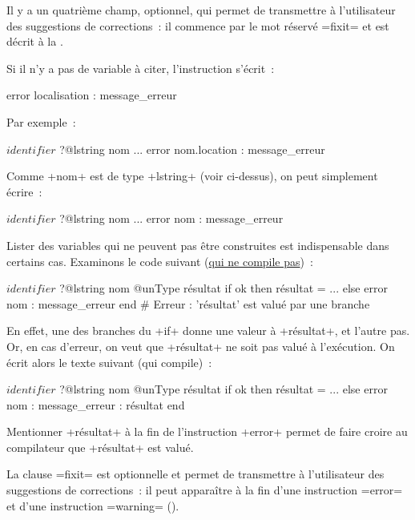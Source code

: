 Il y a un quatrième champ, optionnel, qui permet de transmettre à l'utilisateur des suggestions de corrections~: il commence par le mot réservé \ggsq=fixit= et est décrit à la .

Si il n'y a pas de variable à citer, l'instruction s'écrit~:
\begin{galgas4}
error localisation : message_erreur
\end{galgas4}

Par exemple~:

\begin{galgas4}
$identifier$ ?@lstring nom
...
error nom.location : message_erreur
\end{galgas4}

Comme \ggsq+nom+ est de type \ggsq+lstring+ (voir ci-dessus), on peut simplement écrire~:
\begin{galgas4}
$identifier$ ?@lstring nom
...
error nom : message_erreur
\end{galgas4}



Lister des variables qui ne peuvent pas être construites est indispensable dans certains cas. Examinons le code suivant (\underline{qui ne compile pas})~:
\begin{galgas4}
$identifier$ ?@lstring nom
@unType résultat
if ok then
  résultat = ...
else
  error nom : message_erreur
end # Erreur : 'résultat' est valué par une branche
\end{galgas4}

En effet, une des branches du \ggsq+if+ donne une valeur à \ggsq+résultat+, et l'autre pas. Or, en cas d'erreur, on veut que \ggsq+résultat+ ne soit pas valué à l'exécution. On écrit alors le texte suivant (qui compile)~:
\begin{galgas4}
$identifier$ ?@lstring nom
@unType résultat
if ok then
  résultat = ...
else
  error nom : message_erreur : résultat
end
\end{galgas4}

Mentionner \ggsq+résultat+ à la fin de l'instruction \ggsq+error+ permet de faire croire au compilateur que \ggsq+résultat+ est valué.



La clause \ggsq=fixit= est optionnelle et permet de transmettre à l'utilisateur des suggestions de corrections~: il peut apparaître à la fin d'une instruction \ggsq=error= et d'une instruction \ggsq=warning= ().

